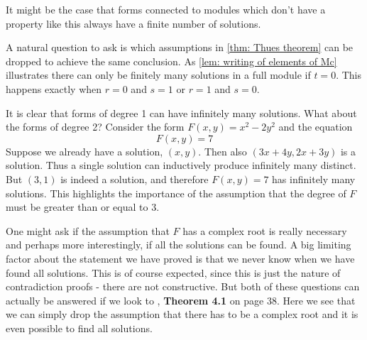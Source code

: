 \documentclass{article}
\begin{document}
It might be the case that forms connected to modules which don't have a property like this always have a finite number of solutions. 



A natural question to ask is which assumptions in \cref{thm: Thues theorem} can be dropped to achieve the same conclusion. As \cref{lem: writing of elements of Mc} illustrates there can only be finitely many solutions in a full module if $t = 0$. This happens exactly when $r = 0$ and $s = 1$ or $r = 1$ and $s = 0$. 

It is clear that forms of degree 1 can have infinitely many solutions. What about the forms of degree 2? Consider the form $F(x,y) = x^2 - 2y^2$ and the equation 
$$F(x, y) = 7$$
Suppose we already have a solution, $(x,y)$. Then also $(3x + 4y, 2x + 3y)$ is a solution. Thus a single solution can inductively produce infinitely many distinct. But $(3,1)$ is indeed a solution, and therefore $F(x, y) = 7$ has infinitely many solutions. This highlights the importance of the assumption that the degree of $F$ must be greater than or equal to 3.   


One might ask if the assumption that $F$ has a complex root is really necessary and perhaps more interestingly, if all the solutions can be found. A big limiting factor about the statement we have proved is that we never know when we have found all solutions. This is of course expected, since this is just the nature of contradiction proofs - there are not constructive. But both of these questions can actually be answered if we look to \cite{baker}, \textbf{Theorem 4.1} on page 38. Here we see that we can simply drop the assumption that there has to be a complex root and it is even possible to find all solutions.


\end{document}
